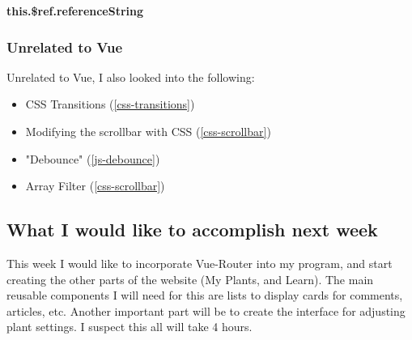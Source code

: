 \documentclass[portfolio.tex]{subfiles}
\begin{document}
					\begin{center}
						 \textbf{this.\$ref.referenceString}\\
					\end{center}


					\noindent \autocite{vue-refs}

				\subsubsection{Unrelated to Vue}
					Unrelated to Vue, I also looked into the following:
					\begin{itemize}
						\item CSS Transitions (\ref{css-transitions})
						\item Modifying the scrollbar with CSS (\ref{css-scrollbar})
						\item "Debounce" (\ref{js-debounce})
						\item Array Filter (\ref{css-scrollbar})
					\end{itemize}

			\subsection{What I would like to accomplish next week}
				This week I would like to incorporate Vue-Router into my program, and start creating the other parts of the website (My Plants, and Learn). The main reusable components I will need for this are lists to display cards for comments, articles, etc. Another important part will be to create the interface for adjusting plant settings. I suspect this all will take 4 hours.

\pagebreak
\end{document}
